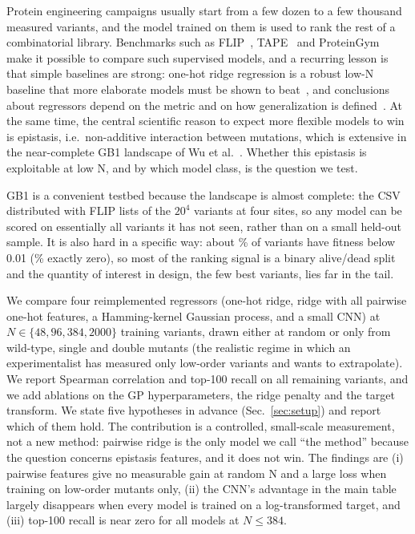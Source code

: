 Protein engineering campaigns usually start from a few dozen to a few thousand measured variants, and the model trained on them is used to rank the rest of a combinatorial library.
Benchmarks such as FLIP~\cite{dallago2021flip}, TAPE~\cite{rao2019evaluating} and ProteinGym~\cite{notin2023proteingym} make it possible to compare such supervised models, and a recurring lesson is that simple baselines are strong: one-hot ridge regression is a robust low-N baseline that more elaborate models must be shown to beat~\cite{hsu2022learning}, and conclusions about regressors depend on the metric and on how generalization is defined~\cite{michael2024systematic}.
At the same time, the central scientific reason to expect more flexible models to win is epistasis, i.e.\ non-additive interaction between mutations, which is extensive in the near-complete GB1 landscape of Wu et al.~\cite{wu2016adaptation}.
Whether this epistasis is exploitable at low N, and by which model class, is the question we test.

GB1 is a convenient testbed because the landscape is almost complete: the CSV distributed with FLIP lists  of the $20^4$ variants at four sites, so any model can be scored on essentially all variants it has not seen, rather than on a small held-out sample.
It is also hard in a specific way: about \% of variants have fitness below 0.01 (\% exactly zero), so most of the ranking signal is a binary alive/dead split and the quantity of interest in design, the few best variants, lies far in the tail.

We compare four reimplemented regressors (one-hot ridge, ridge with all pairwise one-hot features, a Hamming-kernel Gaussian process, and a small CNN) at $N\in\{48,96,384,2000\}$ training variants, drawn either at random or only from wild-type, single and double mutants (the realistic regime in which an experimentalist has measured only low-order variants and wants to extrapolate).
We report Spearman correlation and top-100 recall on all remaining variants, and we add ablations on the GP hyperparameters, the ridge penalty and the target transform.
We state five hypotheses in advance (Sec.~\ref{sec:setup}) and report which of them hold.
The contribution is a controlled, small-scale measurement, not a new method: pairwise ridge is the only model we call ``the method'' because the question concerns epistasis features, and it does not win.
The findings are (i) pairwise features give no measurable gain at random N and a large loss when training on low-order mutants only, (ii) the CNN's advantage in the main table largely disappears when every model is trained on a log-transformed target, and (iii) top-100 recall is near zero for all models at $N\le 384$.
